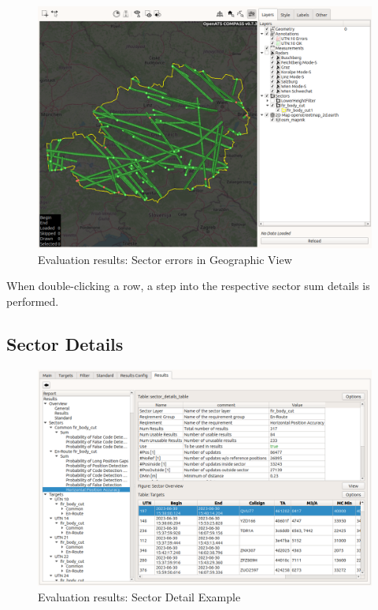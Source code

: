 \begin{figure}[H]
  \hspace*{-2.5cm}
    \includegraphics[width=19cm,frame]{figures/eval_results_geoview.png}
  \caption{Evaluation results: Sector errors in Geographic View}
\end{figure}

When double-clicking a row, a step into the respective sector sum details is performed.

\subsection{Sector Details}

\begin{figure}[H]
  \hspace*{-2cm}
    \includegraphics[width=18cm,frame]{figures/eval_results_sec_det_example.png}
  \caption{Evaluation results: Sector Detail Example}
\end{figure}

